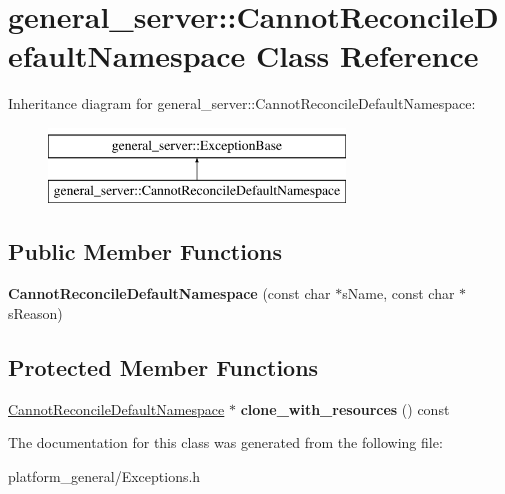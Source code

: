 \hypertarget{classgeneral__server_1_1CannotReconcileDefaultNamespace}{\section{general\-\_\-server\-:\-:\-Cannot\-Reconcile\-Default\-Namespace \-Class \-Reference}
\label{classgeneral__server_1_1CannotReconcileDefaultNamespace}
}
\-Inheritance diagram for general\-\_\-server\-:\-:\-Cannot\-Reconcile\-Default\-Namespace\-:\begin{figure}[H]
\begin{center}
\leavevmode
\includegraphics[height=2.000000cm]{classgeneral__server_1_1CannotReconcileDefaultNamespace}
\end{center}
\end{figure}
\subsection*{\-Public \-Member \-Functions}
\begin{DoxyCompactItemize}
\item 
\hypertarget{classgeneral__server_1_1CannotReconcileDefaultNamespace_ab0b93c8407bb23978dd68f05207a0310}{{\bfseries \-Cannot\-Reconcile\-Default\-Namespace} (const char $\ast$s\-Name, const char $\ast$s\-Reason)}\label{classgeneral__server_1_1CannotReconcileDefaultNamespace_ab0b93c8407bb23978dd68f05207a0310}

\end{DoxyCompactItemize}
\subsection*{\-Protected \-Member \-Functions}
\begin{DoxyCompactItemize}
\item 
\hypertarget{classgeneral__server_1_1CannotReconcileDefaultNamespace_ac183e7d5f93c07ed90b1fa51db9728ec}{\hyperlink{classgeneral__server_1_1CannotReconcileDefaultNamespace}{\-Cannot\-Reconcile\-Default\-Namespace} $\ast$ {\bfseries clone\-\_\-with\-\_\-resources} () const }\label{classgeneral__server_1_1CannotReconcileDefaultNamespace_ac183e7d5f93c07ed90b1fa51db9728ec}

\end{DoxyCompactItemize}


\-The documentation for this class was generated from the following file\-:\begin{DoxyCompactItemize}
\item 
platform\-\_\-general/\-Exceptions.\-h\end{DoxyCompactItemize}
